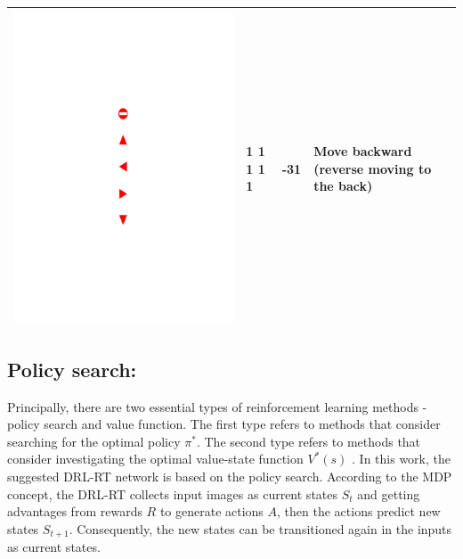 \begin{table}[!h]
\begin{tabular}{|c|C{2cm}|C{2cm}|C{5cm}|}
		\begin{minipage}{.075\textwidth}\includegraphics[scale=.5,trim=9.1cm 8.5cm 9.5cm 18cm,clip]{signs.pdf}\end{minipage} & 1 1 1 1 1 & -31 & Move backward (reverse moving to the back) \\ \hline
	\end{tabular}
\end{table}

\subsection{Policy search:} 
Principally, there are two essential types of reinforcement learning methods - policy search and value function. The first type refers to methods that consider searching for the optimal policy $\pi^*$. The second type refers to methods that consider investigating the optimal value-state function $V^*(s)$ \cite{Arulkumaran2017Deep}. In this work, the suggested DRL-RT network is based on the policy search. According to the MDP concept, the DRL-RT collects input images as current states $S_t$ and getting advantages from rewards $R$ to generate actions $A$, then the actions predict new states $S_{t+1}$. Consequently, the new states can be transitioned again in the inputs as current states. 


